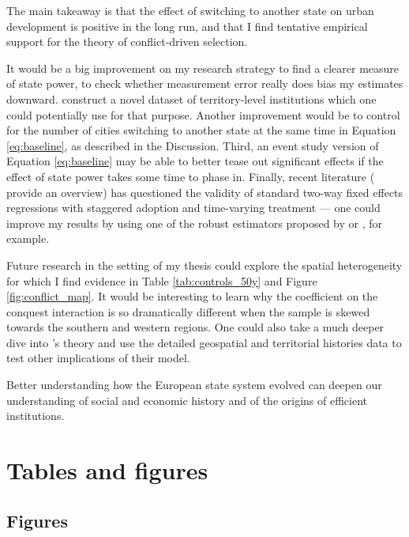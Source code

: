 \documentclass[11pt, a4paper]{article}
\begin{document}
The main takeaway is that the effect of switching to another state on urban development is positive in the long run, and that I find tentative empirical support for the theory of conflict-driven selection.

It would be a big improvement on my research strategy to find a clearer measure of state power, to check whether measurement error really does bias my estimates downward. \cite{cantoni2023} construct a novel dataset of territory-level institutions which one could potentially use for that purpose. Another improvement would be to control for the number of cities switching to another state at the same time in Equation \eqref{eq:baseline}, as described in the Discussion. Third, an event study version of Equation \eqref{eq:baseline} may be able to better tease out significant effects if the effect of state power takes some time to phase in. Finally, recent literature (\cite{baker2022} provide an overview) has questioned the validity of standard two-way fixed effects regressions with staggered adoption and time-varying treatment --- one could improve my results by using one of the robust estimators proposed by \cite{sunab2021} or \cite{cengiz2019}, for example.

Future research in the setting of my thesis could explore the spatial heterogeneity for which I find evidence in Table \ref{tab:controls_50y} and Figure \ref{fig:conflict_map}. It would be interesting to learn why the coefficient on the conquest interaction is so dramatically different when the sample is skewed towards the southern and western regions. One could also take a much deeper dive into \cite{levine2021}'s theory and use the detailed geospatial and territorial histories data to test other implications of their model.

Better understanding how the European state system evolved can deepen our understanding of social and economic history and of the origins of efficient institutions.


\newpage
\onehalfspacing



\newpage
\section*{Tables and figures}



\subsection*{Figures}
\end{document}
